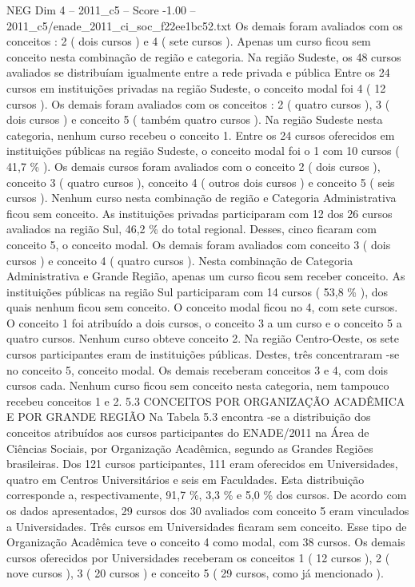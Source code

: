\begin{textsample}{NEG Dim 4 – 2011\_c5 – Score -1.00 – 2011\_c5/enade\_2011\_ci\_soc\_f22ee1bc52.txt}
Os demais foram avaliados com os conceitos : 2 ( dois cursos ) e 4 ( sete cursos ).
Apenas um curso ficou sem conceito nesta combinação de região e categoria.
Na região Sudeste, os 48 cursos avaliados se distribuíam igualmente entre a rede privada e pública Entre os 24 cursos em instituições privadas na região Sudeste, o conceito modal foi 4 ( 12 cursos ).
Os demais foram avaliados com os conceitos : 2 ( quatro cursos ), 3 ( dois cursos ) e conceito 5 ( também quatro cursos ).
Na região Sudeste nesta categoria, nenhum curso recebeu o conceito 1.
Entre os 24 cursos oferecidos em instituições públicas na região Sudeste, o conceito modal foi o 1 com 10 cursos ( 41,7 \% ).
Os demais cursos foram avaliados com o conceito 2 ( dois cursos ), conceito 3 ( quatro cursos ), conceito 4 ( outros dois cursos ) e conceito 5 ( seis cursos ).
Nenhum curso nesta combinação de região e Categoria Administrativa ficou sem conceito.
As instituições privadas participaram com 12 dos 26 cursos avaliados na região Sul, 46,2 \% do total regional.
Desses, cinco ficaram com conceito 5, o conceito modal.
Os demais foram avaliados com conceito 3 ( dois cursos ) e conceito 4 ( quatro cursos ).
Nesta combinação de Categoria Administrativa e Grande Região, apenas um curso ficou sem receber conceito.
As instituições públicas na região Sul participaram com 14 cursos ( 53,8 \% ), dos quais nenhum ficou sem conceito.
O conceito modal ficou no 4, com sete cursos.
O conceito 1 foi atribuído a dois cursos, o conceito 3 a um curso e o conceito 5 a quatro cursos.
Nenhum curso obteve conceito 2.
Na região Centro-Oeste, os sete cursos participantes eram de instituições públicas.
Destes, três concentraram -se no conceito 5, conceito modal.
Os demais receberam conceitos 3 e 4, com dois cursos cada.
Nenhum curso ficou sem conceito nesta categoria, nem tampouco recebeu conceitos 1 e 2. 5.3 CONCEITOS POR ORGANIZAÇÃO ACADÊMICA E POR GRANDE REGIÃO Na Tabela 5.3 encontra -se a distribuição dos conceitos atribuídos aos cursos participantes do ENADE/2011 na Área de Ciências Sociais, por Organização Acadêmica, segundo as Grandes Regiões brasileiras.
Dos 121 cursos participantes, 111 eram oferecidos em Universidades, quatro em Centros Universitários e seis em Faculdades.
Esta distribuição corresponde a, respectivamente, 91,7 \%, 3,3 \% e 5,0 \% dos cursos.
De acordo com os dados apresentados, 29 cursos dos 30 avaliados com conceito 5 eram vinculados a Universidades.
Três cursos em Universidades ficaram sem conceito.
Esse tipo de Organização Acadêmica teve o conceito 4 como modal, com 38 cursos.
Os demais cursos oferecidos por Universidades receberam os conceitos 1 ( 12 cursos ), 2 ( nove cursos ), 3 ( 20 cursos ) e conceito 5 ( 29 cursos, como já mencionado ).

\end{textsample}

